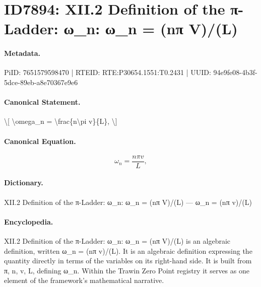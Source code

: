 \section*{ID7894: XII.2 Definition of the π-Ladder: ω\_n: ω\_n = (nπ V)/(L)}
\paragraph{Metadata.}
PiID: 7651579598470 | RTEID: RTE:P30654.1551:T0.2431 | UUID: 94e9fe08-4b3f-5dce-89eb-a8e70367e9e6

\paragraph{Canonical Statement.}
\textbackslash{}[ \textbackslash{}omega\_n = \textbackslash{}frac\{n\textbackslash{}pi v\}\{L\}, \textbackslash{}]

\paragraph{Canonical Equation.}
\[
\omega_n = \frac{n\pi v}{L},
\]

\paragraph{Dictionary.}
XII.2 Definition of the π-Ladder: ω\_n: ω\_n = (nπ V)/(L) — ω\_n = (nπ v)/(L)

\paragraph{Encyclopedia.}
XII.2 Definition of the π-Ladder: ω\_n: ω\_n = (nπ V)/(L) is an algebraic definition, written ω\_n = (nπ v)/(L). It is an algebraic definition expressing the quantity directly in terms of the variables on its right-hand side. It is built from π, n, v, L, defining ω\_n. Within the Trawin Zero Point registry it serves as one element of the framework's mathematical narrative.
